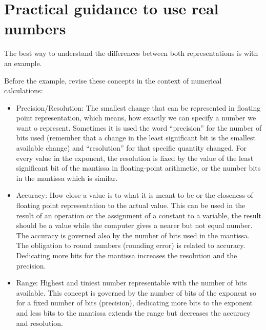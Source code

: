 \section{Practical guidance to use real numbers} 


The best way to understand the differences between both representations is with an example. 

\begin{IN}
    Before the example, revise these concepts in the context of numerical calculations:
    \begin{itemize}
        \item Precision/Resolution: The smallest change that can be represented in floating point representation, which means, how exactly we 
        can specify a number we want o represent. Sometimes it is used the word ``precision'' for the number of bits used (remember that a 
        change in the least significant bit is the smallest available change) and ``resolution'' for that specific quantity changed. For 
        every value in the exponent, the resolution is fixed by the value of the least significant bit of the mantissa in floating-point 
        arithmetic, or the number bits in the mantissa which is similar. 

        \item Accuracy: How close a value is to what it is meant to be or the closeness of floating point representation to the actual value. 
        This can be used in the result of an operation or the assignment of a constant to a variable, the result should be a value while the 
        computer gives a nearer but not equal number. The accuracy is governed also by the number of bits used in the mantissa. The 
        obligation to round numbers (rounding error) is related to accuracy. Dedicating more bits for the mantissa increases the resolution 
        and the precision.
        
        \item Range: Highest and tiniest number representable with the number of bits available. This concept is governed by the number of 
        bits of the exponent so for a fixed number of bits (precision), dedicating more bits to the exponent and less bits to the mantissa 
        extends the range but decreases the accuracy and resolution. 
    \end{itemize}
\end{IN}







